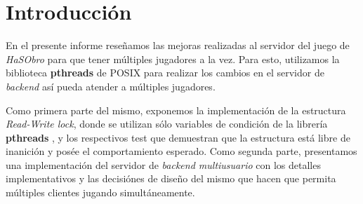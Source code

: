 \section{Introducción}

En el presente informe reseñamos las mejoras realizadas al servidor del juego de \textit{HaSObro} para que tener múltiples jugadores a la vez. Para esto, utilizamos la biblioteca \textbf{pthreads} de POSIX para realizar los cambios en el servidor de \textit{backend} así pueda atender a múltiples jugadores.

Como primera parte del mismo, exponemos la implementación de la estructura \textit{Read-Write lock}, donde se utilizan sólo variables de condición de la librería \textbf{pthreads} , y los respectivos test que demuestran que la estructura está libre de inanición y posée el comportamiento esperado. Como segunda parte, presentamos una implementación del servidor de \textit{backend multiusuario} con los detalles implementativos y las decisiónes de diseño del mismo que hacen que permita múltiples clientes jugando simultáneamente.
